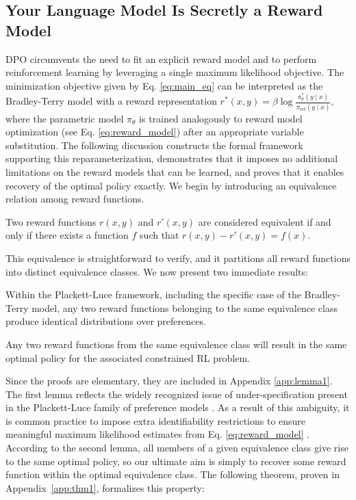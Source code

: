 \label{sec:theory}

\subsection{Your Language Model Is Secretly a Reward Model} 
DPO circumvents the need to fit an explicit reward model and to perform reinforcement learning by leveraging a single maximum likelihood objective. The minimization objective given by Eq. \ref{eq:main_eq} can be interpreted as the Bradley-Terry model with a reward representation $r^*(x, y) = \beta \log\frac{\pi^*_\theta(y \mid x)}{\pi_\text{ref}(y \mid x)}$, where the parametric model $\pi_{\theta}$ is trained analogously to reward model optimization (see Eq. \ref{eq:reward_model}) after an appropriate variable substitution. The following discussion constructs the formal framework supporting this reparameterization, demonstrates that it imposes no additional limitations on the reward models that can be learned, and proves that it enables recovery of the optimal policy exactly. We begin by introducing an equivalence relation among reward functions.

\begin{definition}
Two reward functions $r(x, y)$ and $r'(x, y)$ are considered equivalent if and only if there exists a function $f$ such that $r(x, y)-r'(x, y) = f(x)$.     
\end{definition}

This equivalence is straightforward to verify, and it partitions all reward functions into distinct equivalence classes. We now present two immediate results:

\begin{lemma}\label{lemma:same_prefrence} Within the Plackett-Luce framework, including the specific case of the Bradley-Terry model, any two reward functions belonging to the same equivalence class produce identical distributions over preferences.
\end{lemma}

\begin{lemma}\label{lemma:same_policy}
    Any two reward functions from the same equivalence class will result in the same optimal policy for the associated constrained RL problem.
\end{lemma}

Since the proofs are elementary, they are included in Appendix \ref{app:lemma1}. The first lemma reflects the widely recognized issue of under-specification present in the Plackett-Luce family of preference models \cite{plackett1975analysis}. As a result of this ambiguity, it is common practice to impose extra identifiability restrictions to ensure meaningful maximum likelihood estimates from Eq. \ref{eq:reward_model} \cite{bong2022generalized}. According to the second lemma, all members of a given equivalence class give rise to the same optimal policy, so our ultimate aim is simply to recover some reward function within the optimal equivalence class. The following theorem, proven in Appendix~\ref{app:thm1}, formalizes this property:

